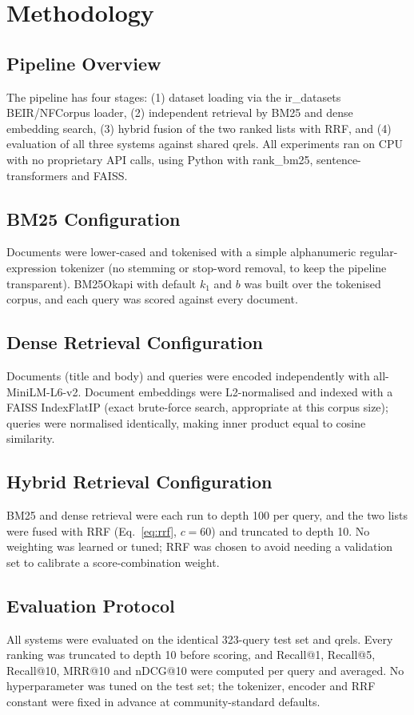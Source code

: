 \documentclass[10pt,letterpaper,twocolumn]{article}
\begin{document}
\section{Methodology}
\subsection{Pipeline Overview}
The pipeline has four stages: (1) dataset loading via the ir\_datasets BEIR/NFCorpus loader, (2) independent retrieval by BM25 and dense embedding search, (3) hybrid fusion of the two ranked lists with RRF, and (4) evaluation of all three systems against shared qrels. All experiments ran on CPU with no proprietary API calls, using Python with rank\_bm25, sentence-transformers and FAISS.

\subsection{BM25 Configuration}
Documents were lower-cased and tokenised with a simple alphanumeric regular-expression tokenizer (no stemming or stop-word removal, to keep the pipeline transparent). BM25Okapi with default $k_1$ and $b$ was built over the tokenised corpus, and each query was scored against every document.

\subsection{Dense Retrieval Configuration}
Documents (title and body) and queries were encoded independently with all-MiniLM-L6-v2. Document embeddings were L2-normalised and indexed with a FAISS IndexFlatIP (exact brute-force search, appropriate at this corpus size); queries were normalised identically, making inner product equal to cosine similarity.

\subsection{Hybrid Retrieval Configuration}
BM25 and dense retrieval were each run to depth 100 per query, and the two lists were fused with RRF (Eq.~\ref{eq:rrf}, $c=60$) and truncated to depth 10. No weighting was learned or tuned; RRF was chosen to avoid needing a validation set to calibrate a score-combination weight.

\subsection{Evaluation Protocol}
All systems were evaluated on the identical 323-query test set and qrels. Every ranking was truncated to depth 10 before scoring, and Recall@1, Recall@5, Recall@10, MRR@10 and nDCG@10 were computed per query and averaged. No hyperparameter was tuned on the test set; the tokenizer, encoder and RRF constant were fixed in advance at community-standard defaults.
\end{document}
